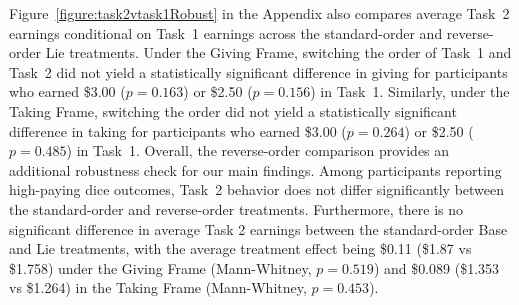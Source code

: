 \documentclass{article}
\begin{document}
\par
Figure~\ref{figure:task2vtask1Robust} in the Appendix also compares average Task~2 earnings conditional on Task~1 earnings across the standard-order and reverse-order Lie treatments. Under the Giving Frame, switching the order of Task~1 and Task~2 did not yield a statistically significant difference in giving for participants who earned \$3.00 ($p=0.163$) or \$2.50 ($p=0.156$) in Task~1. Similarly, under the Taking Frame, switching the order did not yield a statistically significant difference in taking for participants who earned \$3.00 ($p=0.264$) or \$2.50 ($p=0.485$) in Task~1. Overall, the reverse-order comparison provides an additional robustness check for our main findings. Among participants reporting high-paying dice outcomes, Task~2 behavior does not differ significantly between the standard-order and reverse-order treatments. Furthermore, there is no significant difference in average Task 2 earnings between the standard-order Base and Lie treatments, with the average treatment effect being \$0.11 (\$1.87 vs \$1.758) under the Giving Frame (Mann-Whitney, $p=0.519$) and \$0.089 (\$1.353 vs \$1.264) in the Taking Frame (Mann-Whitney, $p=0.453$).
\end{document}
